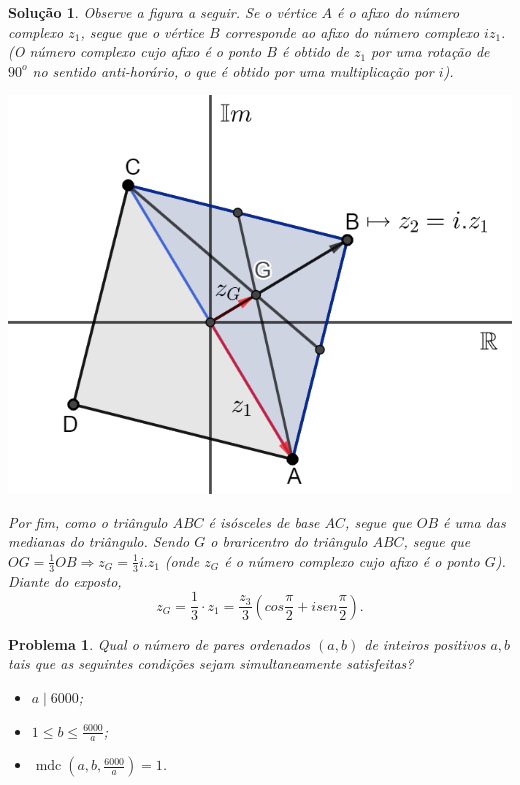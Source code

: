 \documentclass{hipatia}
\newtheorem{problem*}{Problema}
\newtheorem*{solution*}{Solução}
\begin{document}
\newpage 
\begin{solution*}
Observe a figura a seguir. Se o vértice $A$ é o afixo do número complexo $z_1$, segue que o vértice $B$ corresponde ao afixo do número complexo $iz_1$.(O número complexo cujo afixo é o ponto $B$ é obtido de $z_1$ por uma rotação de $90^o$ no sentido anti-horário, o que é obtido por uma multiplicação por $i$). 
     \begin{center}
        \includegraphics[scale=0.6]{ElonComplexosSol.png}
    \end{center}
     Por fim, como o triângulo $ABC$ é isósceles de base $AC$, segue que $OB$ é uma das medianas do triângulo. Sendo $G$ o braricentro do triângulo $ABC$, segue que $OG=\frac{1}{3}OB \Rightarrow z_G=\frac{1}{3}i.z_1$ (onde $z_G$ é o número complexo cujo afixo é o ponto $G$). Diante do exposto,
     $$z_G=\frac{1}{3} \cdot z_1=\frac{z_3}{3}\left(cos\frac{\pi}{2}+isen\frac{\pi}{2}\right).  $$

\end{solution*}

\begin{problem*}
Qual o número de pares ordenados $(a,b)$ de inteiros positivos $a, b$ tais que as seguintes condições sejam simultaneamente satisfeitas?


\begin{itemize}
    \item [$(i)$]  
    $a\mid 6000$;
    \item [$(ii)$] 
    $1\le b \le \frac{6000}{a}$;
     \item [$(ii)$]
     $\operatorname{mdc}(a, b,\frac{6000}{a}) = 1$.
\end{itemize}
\end{problem*}
\end{document}
